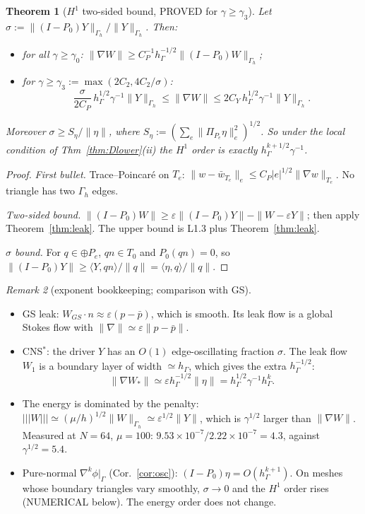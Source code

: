 \documentclass[11pt]{article}
\newtheorem{theorem}{Theorem}[section]
\theoremstyle{remark}
\newtheorem{remark}[theorem]{Remark}
\newcommand{\tn}[1]{|\!|\!|#1|\!|\!|}
\newcommand{\hG}{h_\Gamma}
\newcommand{\Gh}{\Gamma_h}
\newcommand{\ip}[2]{\langle #1,#2\rangle}
\begin{document}
\begin{theorem}[$H^1$ two-sided bound, PROVED for $\gamma\ge\gamma_3$]\label{thm:H1}
Let $\sigma:=\|(I-P_0)Y\|_{\Gh}/\|Y\|_{\Gh}$. Then:
\begin{itemize}
\item for all $\gamma\ge\gamma_0$: $\|\nabla W\|\ge C_P^{-1}\hG^{-1/2}\|(I-P_0)W\|_{\Gh}$;
\item for $\gamma\ge\gamma_3:=\max(2C_2,4C_2/\sigma)$:
\[
\frac{\sigma}{2C_P}\,\hG^{1/2}\gamma^{-1}\|Y\|_{\Gh}\le\|\nabla W\|\le 2C_Y\,\hG^{1/2}\gamma^{-1}\|Y\|_{\Gh}.
\]
\end{itemize}
Moreover $\sigma\ge S_\eta/\|\eta\|$, where $S_\eta:=(\sum_e\|\Pi_{P_e}\eta\|_e^2)^{1/2}$. So under the local condition of
Thm~\ref{thm:Dlower}(ii) the $H^1$ order is exactly $\hG^{k+1/2}\gamma^{-1}$.
\end{theorem}
\begin{proof}
\emph{First bullet.} Trace--Poincar\'e on $T_e$: $\|w-\bar w_{T_e}\|_e\le C_P|e|^{1/2}\|\nabla w\|_{T_e}$. No triangle has two
$\Gh$ edges.

\emph{Two-sided bound.} $\|(I-P_0)W\|\ge\varepsilon\|(I-P_0)Y\|-\|W-\varepsilon Y\|$; then apply Theorem~\ref{thm:leak}. The upper
bound is L1.3 plus Theorem~\ref{thm:leak}.

\emph{$\sigma$ bound.} For $q\in\oplus P_e$, $qn\in T_0$ and $P_0(qn)=0$, so
$\|(I-P_0)Y\|\ge\ip{Y}{qn}/\|q\|=\ip{\eta}{q}/\|q\|$.
\end{proof}

\begin{remark}[exponent bookkeeping; comparison with GS]
\begin{itemize}
\item GS leak: $W_{GS}\cdot n\approx\varepsilon(p-\bar p)$, which is smooth. Its leak flow is a global Stokes flow with
$\|\nabla\|\simeq\varepsilon\|p-\bar p\|$.
\item CNS$^\ast$: the driver $Y$ has an $O(1)$ edge-oscillating fraction $\sigma$. The leak flow $W_1$ is a boundary layer
of width $\simeq\hG$, which gives the extra $\hG^{-1/2}$:
\[
\|\nabla W_\ast\|\simeq\varepsilon\hG^{-1/2}\|\eta\|=\hG^{1/2}\gamma^{-1}\hG^{k}.
\]
\item The energy is dominated by the penalty: $\tn W\simeq(\mu/h)^{1/2}\|W\|_{\Gh}\simeq\varepsilon^{1/2}\|Y\|$, which is
$\gamma^{1/2}$ larger than $\|\nabla W\|$. Measured at $N=64$, $\mu=100$: $9.53\times10^{-7}/2.22\times10^{-7}=4.3$, against
$\gamma^{1/2}=5.4$.
\item Pure-normal $\nabla^k\phi|_\Gamma$ (Cor.~\ref{cor:osc}): $(I-P_0)\eta=O(\hG^{k+1})$. On meshes whose boundary triangles
vary smoothly, $\sigma\to0$ and the $H^1$ order rises (NUMERICAL below). The energy order does not change.
\end{itemize}
\end{remark}
\end{document}
